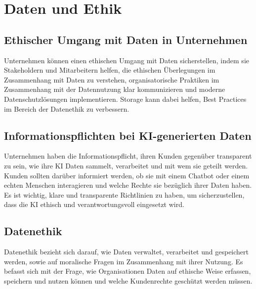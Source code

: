 \section{Daten und Ethik}
\subsection{Ethischer Umgang mit Daten in Unternehmen}

Unternehmen können einen ethischen Umgang mit Daten sicherstellen, indem sie Stakeholdern und Mitarbeitern helfen, die ethischen Überlegungen im Zusammenhang mit Daten zu verstehen, organisatorische Praktiken im Zusammenhang mit der Datennutzung klar kommunizieren und moderne Datenschutzlösungen implementieren. Storage kann dabei helfen, Best Practices im Bereich der Datenethik zu verbessern.
\citep{ai-ethik-pure}

\subsection{Informationspflichten bei KI-generierten Daten}

Unternehmen haben die Informationspflicht, ihren Kunden gegenüber transparent zu sein, wie ihre KI Daten sammelt, verarbeitet und mit wem sie geteilt werden. Kunden sollten darüber informiert werden, ob sie mit einem Chatbot oder einem echten Menschen interagieren und welche Rechte sie bezüglich ihrer Daten haben. Es ist wichtig, klare und transparente Richtlinien zu haben, um sicherzustellen, dass die KI ethisch und verantwortungsvoll eingesetzt wird.
\citep{ai-res-cmm360}

\subsection{Datenethik}

Datenethik bezieht sich darauf, wie Daten verwaltet, verarbeitet und gespeichert werden, sowie auf moralische Fragen im Zusammenhang mit ihrer Nutzung. Es befasst sich mit der Frage, wie Organisationen Daten auf ethische Weise erfassen, speichern und nutzen können und welche Kundenrechte geschützt werden müssen.
\citep{ai-ethik-pure}